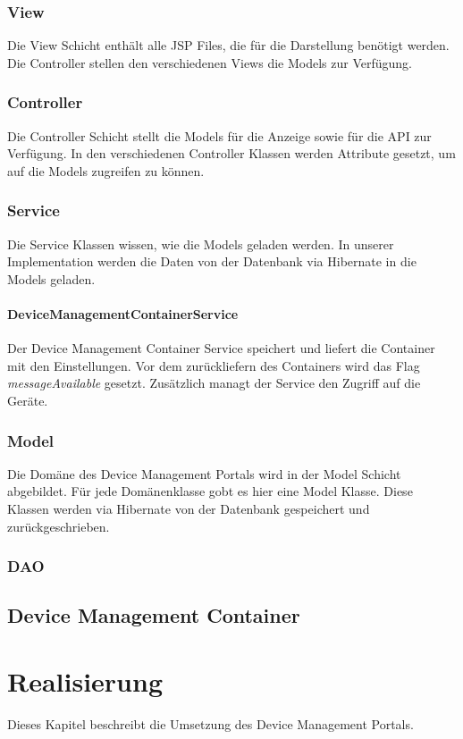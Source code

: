 \subsubsection{View}
Die View Schicht enthält alle JSP Files, die für die Darstellung benötigt werden. Die Controller stellen den verschiedenen Views die Models zur Verfügung.

\subsubsection{Controller}
Die Controller Schicht stellt die Models für die Anzeige sowie für die API zur Verfügung. In den verschiedenen Controller Klassen werden Attribute gesetzt, um auf die Models zugreifen zu können.

\subsubsection{Service}
Die Service Klassen wissen, wie die Models geladen werden. In unserer Implementation werden die Daten von der Datenbank via Hibernate in die Models geladen.

\paragraph{DeviceManagementContainerService}
Der Device Management Container Service speichert und liefert die Container mit den Einstellungen. Vor dem zurückliefern des Containers wird das Flag \textit{messageAvailable} gesetzt. Zusätzlich managt der Service den Zugriff auf die Geräte. 

\subsubsection{Model}
Die Domäne des Device Management Portals wird in der Model Schicht abgebildet. Für jede Domänenklasse gobt es hier eine Model Klasse. Diese Klassen werden via Hibernate von der Datenbank gespeichert und zurückgeschrieben.

\subsubsection{DAO}

\subsection{Device Management Container}

\section{Realisierung}
Dieses Kapitel beschreibt die Umsetzung des Device Management Portals.

